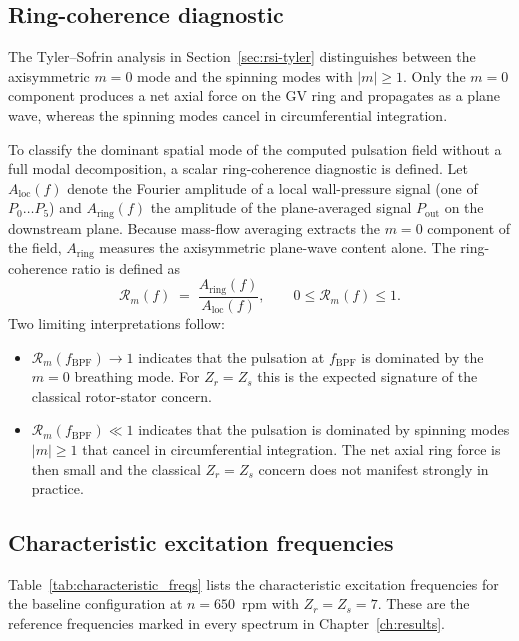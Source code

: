 \subsection{Ring-coherence diagnostic}
\label{sec:spec-coherence}
 
The Tyler--Sofrin analysis in Section~\ref{sec:rsi-tyler}
distinguishes between the axisymmetric $m=0$ mode and the spinning
modes with $|m|\geq 1$. Only the $m=0$ component produces a net axial
force on the GV ring and propagates as a plane wave, whereas
the spinning modes cancel in circumferential integration.
 
To classify the dominant spatial mode of the computed pulsation field
without a full modal decomposition, a scalar ring-coherence
diagnostic is defined. Let $A_{\mathrm{loc}}(f)$ denote the Fourier
amplitude of a local wall-pressure signal (one of $P_0 \ldots P_5$)
and $A_{\mathrm{ring}}(f)$ the amplitude of the plane-averaged signal
$P_{\mathrm{out}}$ on the downstream plane. Because mass-flow
averaging extracts the $m=0$ component of the field,
$A_{\mathrm{ring}}$ measures the axisymmetric plane-wave content
alone. The ring-coherence ratio is defined as
\begin{equation}
    \mathcal{R}_m(f) \;=\;
    \frac{A_{\mathrm{ring}}(f)}{A_{\mathrm{loc}}(f)},
    \qquad 0 \leq \mathcal{R}_m(f) \leq 1. \label{eq:coherence}
\end{equation}
Two limiting interpretations follow:
\begin{itemize}
  \item $\mathcal{R}_m(f_{\mathrm{BPF}}) \to 1$ indicates that the
        pulsation at $f_{\mathrm{BPF}}$ is dominated by the $m=0$
        breathing mode. For $Z_r = Z_s$ this is the expected
        signature of the classical rotor-stator concern.
  \item $\mathcal{R}_m(f_{\mathrm{BPF}}) \ll 1$ indicates that the
        pulsation is dominated by spinning modes $|m|\geq 1$ that
        cancel in circumferential integration. The net axial ring
        force is then small and the classical $Z_r = Z_s$ concern
        does not manifest strongly in practice.
\end{itemize}
 
\subsection{Characteristic excitation frequencies}
\label{sec:spec-peaks}
 
Table~\ref{tab:characteristic_freqs} lists the characteristic
excitation frequencies for the baseline configuration at
$n = 650$~rpm with $Z_r = Z_s = 7$. These are the reference
frequencies marked in every spectrum in Chapter~\ref{ch:results}.
 
